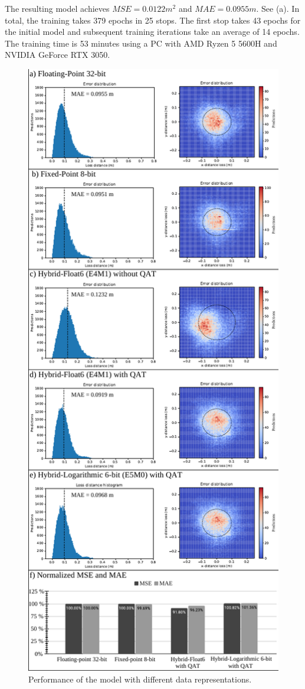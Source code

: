 The resulting model achieves $MSE=0.0122m^2$ and $MAE=0.0955m$. See (a). In total, the training takes 379 epochs in 25 stops. The first stop takes 43 epochs for the initial model and subsequent training iterations take an average of 14 epochs. The training time is 53 minutes using a PC with AMD Ryzen 5 5600H and NVIDIA GeForce RTX 3050.

\begin{figure}[h!]
	\centering
	\includegraphics[width=\columnwidth]{../figures/histograms/model_evaluation.pdf}
	\caption{Performance of the model with different data representations.}
	\label{fig:model_evaluation}
\end{figure}

